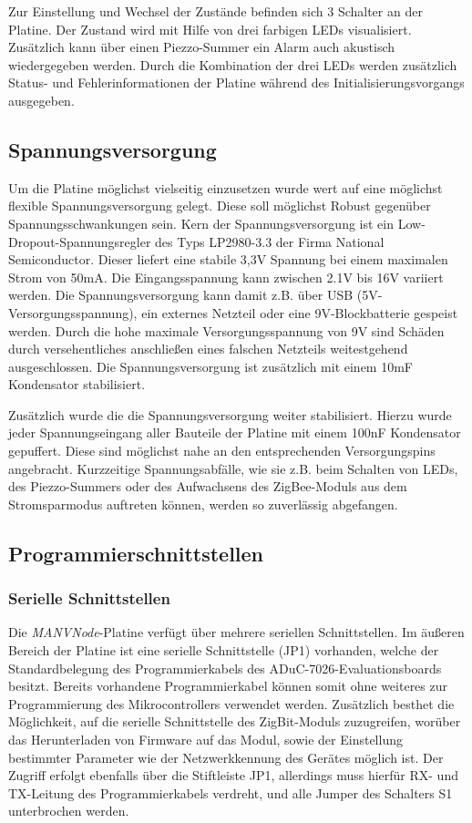 Zur Einstellung und Wechsel der Zustände befinden sich 3 Schalter an der Platine. Der Zustand wird mit Hilfe von
drei farbigen LEDs visualisiert. Zusätzlich kann über einen Piezzo-Summer ein Alarm auch akustisch wiedergegeben werden.
Durch die Kombination der drei LEDs werden zusätzlich Status- und Fehlerinformationen der Platine während des 
Initialisierungsvorgangs ausgegeben.

\subsection{Spannungsversorgung}
Um die Platine möglichst vielseitig einzusetzen wurde wert auf eine möglichst flexible Spannungsversorgung gelegt. Diese
soll möglichst Robust gegenüber Spannungsschwankungen sein. Kern der Spannungsversorgung ist ein 
Low-Dropout-Spannungsregler des Typs LP2980-3.3 der Firma National Semiconductor. Dieser liefert eine stabile
3,3V Spannung bei einem maximalen Strom von 50mA. Die Eingangsspannung kann zwischen 2.1V bis 16V variiert werden.
Die Spannungsversorgung kann damit z.B. über USB (5V-Versorgungsspannung), ein externes Netzteil oder eine 
9V-Blockbatterie gespeist werden. Durch die hohe maximale Versorgungsspannung von 9V sind Schäden durch versehentliches
anschließen eines falschen Netzteils weitestgehend ausgeschlossen. Die Spannungsversorgung ist zusätzlich mit einem 10mF 
Kondensator stabilisiert.

Zusätzlich wurde die die Spannungsversorgung weiter stabilisiert. Hierzu wurde jeder Spannungseingang aller Bauteile der
Platine mit einem 100nF Kondensator gepuffert. Diese sind möglichst nahe an den entsprechenden Versorgungspins angebracht.
Kurzzeitige Spannungsabfälle, wie sie z.B. beim Schalten von LEDs, des Piezzo-Summers oder des Aufwachsens des ZigBee-Moduls
aus dem Stromsparmodus auftreten können, werden so zuverlässig abgefangen.

\subsection{Programmierschnittstellen}

\subsubsection{Serielle Schnittstellen}
Die \emph{MANVNode}-Platine verfügt über mehrere seriellen Schnittstellen. Im äußeren Bereich der Platine ist eine serielle 
Schnittstelle (JP1) vorhanden, welche der Standardbelegung des Programmierkabels des ADuC-7026-Evaluationsboards besitzt.
Bereits vorhandene Programmierkabel können somit ohne weiteres zur Programmierung des Mikrocontrollers verwendet werden.
Zusätzlich besthet die Möglichkeit, auf die serielle Schnittstelle des ZigBit-Moduls zuzugreifen, worüber das Herunterladen 
von Firmware auf das Modul, sowie der Einstellung bestimmter Parameter wie der Netzwerkkennung des Gerätes möglich ist.
Der Zugriff erfolgt ebenfalls über die Stiftleiste JP1, allerdings muss hierfür RX- und TX-Leitung des Programmierkabels 
verdreht, und alle Jumper des Schalters S1 unterbrochen werden. 

